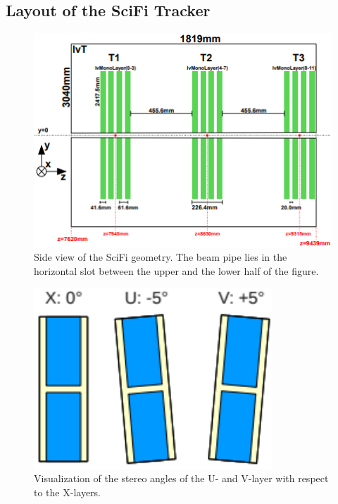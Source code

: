 \subsection{Layout of the SciFi Tracker}

\begin{figure}
  \centering
  \includegraphics{plots/scifi_layers.png}
  \caption{Side view of the SciFi geometry. The beam pipe lies in the horizontal slot between the upper and the lower half of the figure.\cite{scifiInfo}}
  \label{fig:scifi}
\end{figure}

\begin{figure}
  \centering
  \includegraphics[width=0.8\textwidth]{plots/stereo_angles.png}
  \caption{Visualization of the stereo angles of the U- and V-layer with respect to the X-layers.}
  \label{fig:stereo}
\end{figure}

